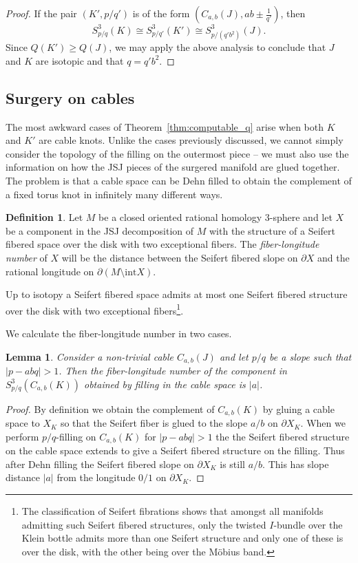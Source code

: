 \documentclass{amsart} %
\theoremstyle{thm}
\newtheorem{lem}[Theorem]{Lemma}
\theoremstyle{definition}
\newtheorem{defi}[Theorem]{Definition}
\numberwithin{equation}{section}
\begin{document}
\begin{proof}
If the pair $(K',p/q')$ is of the form $(C_{a,b}(J), ab\pm \frac{1}{q'})$, then
\[
S_{p/q}^3(K)\cong S_{p/q'}^3(K')\cong S_{p/(q'b^2)}^3(J).
\]
Since $Q(K')\geq Q(J)$, we may apply the above analysis to conclude that $J$ and $K$ are isotopic and that $q=q'b^2$.
\end{proof}

\subsection{Surgery on cables}
The most awkward cases of Theorem~\ref{thm:computable_q} arise when both $K$ and $K'$ are cable knots. Unlike the cases previously discussed, we cannot simply consider the topology of the filling on the outermost piece -- we must also use the information on how the JSJ pieces of the surgered manifold are glued together. The problem is that a cable space can be Dehn filled to obtain the complement of a fixed torus knot in infinitely many different ways.
\begin{defi}
    Let $M$ be a closed oriented rational homology 3-sphere and let $X$ be a component in the JSJ decomposition of $M$ with the structure of a Seifert fibered space over the disk with two exceptional fibers. The {\em fiber-longitude number} of $X$ will be the distance between the Seifert fibered slope on $\partial X$ and the rational longitude on $\partial (M\setminus \mathrm{int} X)$.
\end{defi}
Up to isotopy a Seifert fibered space admits at most one Seifert fibered structure over the disk with two exceptional fibers\footnote{The classification of Seifert fibrations shows that amongst all manifolds admitting such Seifert fibered structures, only the twisted $I$-bundle over the Klein bottle admits more than one Seifert structure and only one of these is over the disk, with the other being over the M\"obius band.}.
 
 We calculate the fiber-longitude number in two cases.
\begin{lem}\label{lem:fiber_long_cable}
Consider a non-trivial cable $C_{a,b}(J)$ and let $p/q$ be a slope such that $|p-abq|>1$. Then the fiber-longitude number of the component in $S_{p/q}^3(C_{a,b}(K))$ obtained by filling in the cable space is $|a|$.
\end{lem}
\begin{proof}
By definition we obtain the complement of $C_{a,b}(K)$ by gluing a cable space to $X_K$ so that the Seifert fiber is glued to the slope $a/b$ on $\partial X_K$. When we perform $p/q$-filling on $C_{a,b}(K)$ for $|p-abq|>1$ the the Seifert fibered structure on the cable space extends to give a Seifert fibered structure on the filling. Thus after Dehn filling the Seifert fibered slope on $\partial X_K$ is still $a/b$. This has slope distance $|a|$ from the longitude $0/1$ on $\partial X_K$.
\end{proof}
\end{document}
